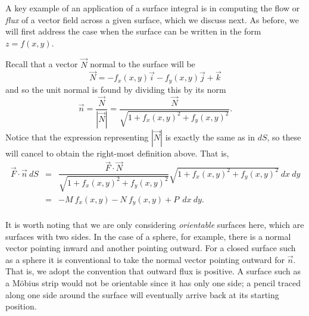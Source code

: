A key example of an application of a surface integral is in computing the flow or \emph{flux} of a vector field across a given surface, which we discuss next.  As before, we will first address the case when the surface can be written in the form $z = f(x,y)$.\\


Recall that a vector $\vec N$ normal to the surface will be
$$\vec N = -f_x(x,y) \vec i - f_y(x,y) \vec j + \vec k$$
and so the unit normal is found by dividing this by its norm
$$\vec n = \dfrac{\vec N}{|\vec N|} = \dfrac{\vec N}{\sqrt{1 + f_x(x,y)^2 + f_y(x,y)^2}}.$$
Notice that the expression representing $| \vec N |$ is exactly the same as in $dS$, so these will cancel to obtain the right-most definition above. That is,
\begin{eqnarray*}
\vec F \cdot \vec n \: dS & = & \dfrac{\vec F \cdot \vec N}{\sqrt{1 + f_x(x,y)^2 + f_y(x,y)^2}} \sqrt{1 + f_x(x,y)^2 + f_y(x,y)^2} \: dx \: dy \\
& = & -M \: f_x(x,y) - N \: f_y(x,y) + P \: \: dx \: dy.
\end{eqnarray*}\\

It is worth noting that we are only considering \emph{orientable} surfaces here, which are surfaces with two sides. In the case of a sphere, for example, there is a normal vector pointing inward and another pointing outward. For a closed surface such as a sphere it is conventional to take the normal vector pointing outward for $\vec n$. That is, we adopt the convention that outward flux is positive. A surface such as a M\"obius strip would not be orientable since it has only one side; a pencil traced along one side around the surface will eventually arrive back at its starting position.\\

